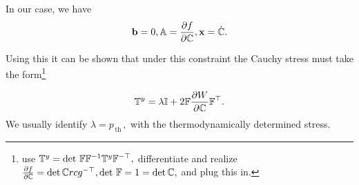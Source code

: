 \documentclass[reqno, a4paper]{article}
\begin{document}
\begin{remark}
	In our case, we have
	\[
		\vb{b} =0, \mathbb{A} = \pdv{f}{\ensuremath{\mathbb{C}}}, \vb{x} = \dot{\mathbb{C}}.
	\]
\end{remark}

Using this it can be shown that under this constraint the Cauchy stress must take the form\footnote{use $\mathbb{T}^y = \det\, \mathbb{F} \mathbb{F}^{-1} \mathbb{T}^y \mathbb{F}^{-\top},$ differentiate and realize $\pdv{f}{\ensuremath{\mathbb{C}}} = \det \mathbb{C} rcg^{-\top}, \det\, \mathbb{F} = 1 = \det \mathbb{C},$ and plug this in.}

\[
	\mathbb{T}^y = \lambda \mathbb{I} + 2 \mathbb{F} \pdv{W}{\ensuremath{\mathbb{C}}} \mathbb{F}^\top.
\]
We usually identify $\lambda = p_{\, \text{th} \,},$ with the thermodynamically determined stress.
\end{document}
